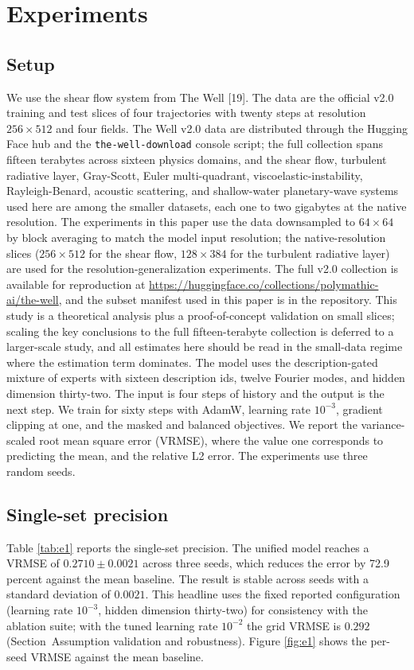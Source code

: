 \documentclass[preprint,12pt]{elsarticle}
\begin{document}
\section{Experiments}
\subsection{Setup}
We use the shear flow system from The Well [19]. The data are the official v2.0 training and test slices of four trajectories with twenty steps at resolution $256\times512$ and four fields. The Well v2.0 data are distributed through the Hugging Face hub and the \texttt{the-well-download} console script; the full collection spans fifteen terabytes across sixteen physics domains, and the shear flow, turbulent radiative layer, Gray-Scott, Euler multi-quadrant, viscoelastic-instability, Rayleigh-Benard, acoustic scattering, and shallow-water planetary-wave systems used here are among the smaller datasets, each one to two gigabytes at the native resolution. The experiments in this paper use the data downsampled to $64\times64$ by block averaging to match the model input resolution; the native-resolution slices ($256\times512$ for the shear flow, $128\times384$ for the turbulent radiative layer) are used for the resolution-generalization experiments. The full v2.0 collection is available for reproduction at \url{https://huggingface.co/collections/polymathic-ai/the-well}, and the subset manifest used in this paper is in the repository. This study is a theoretical analysis plus a proof-of-concept validation on small slices; scaling the key conclusions to the full fifteen-terabyte collection is deferred to a larger-scale study, and all estimates here should be read in the small-data regime where the estimation term dominates. The model uses the description-gated mixture of experts with sixteen description ids, twelve Fourier modes, and hidden dimension thirty-two. The input is four steps of history and the output is the next step. We train for sixty steps with AdamW, learning rate $10^{-3}$, gradient clipping at one, and the masked and balanced objectives. We report the variance-scaled root mean square error (VRMSE), where the value one corresponds to predicting the mean, and the relative L2 error. The experiments use three random seeds.

\subsection{Single-set precision}
Table \ref{tab:e1} reports the single-set precision. The unified model reaches a VRMSE of $0.2710\pm0.0021$ across three seeds, which reduces the error by 72.9 percent against the mean baseline. The result is stable across seeds with a standard deviation of $0.0021$. This headline uses the fixed reported configuration (learning rate $10^{-3}$, hidden dimension thirty-two) for consistency with the ablation suite; with the tuned learning rate $10^{-2}$ the grid VRMSE is $0.292$ (Section~Assumption validation and robustness). Figure \ref{fig:e1} shows the per-seed VRMSE against the mean baseline.
\end{document}
